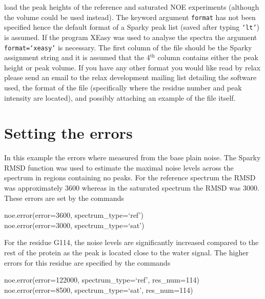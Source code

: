 load the peak heights of the reference and saturated NOE experiments (although the volume could be used instead).  The keyword argument \texttt{format} has not been specified hence the default format of a Sparky peak list (saved after typing \texttt{`lt'}) is assumed.  If the program XEasy was used to analyse the spectra the argument \texttt{format=`xeasy'} is necessary.  The first column of the file should be the Sparky assignment string and it is assumed that the 4$^\textrm{th}$ column contains either the peak height or peak volume.  If you have any other format you would like read by relax please send an email to the relax development mailing list detailing the software used, the format of the file (specifically where the residue number and peak intensity are located), and possibly attaching an example of the file itself.




\section{Setting the errors}

In this example the errors where measured from the base plain noise.  The Sparky RMSD function was used to estimate the maximal noise levels across the spectrum in regions containing no peaks.  For the reference spectrum the RMSD was approximately 3600 whereas in the saturated spectrum the RMSD was 3000.  These errors are set by the commands

\begin{exampleenv}
noe.error(error=3600, spectrum\_type=`ref') \\
noe.error(error=3000, spectrum\_type=`sat')
\end{exampleenv}

For the residue G114, the noise levels are significantly increased compared to the rest of the protein as the peak is located close to the water signal.  The higher errors for this residue are specified by the commands

\begin{exampleenv}
noe.error(error=122000, spectrum\_type=`ref', res\_num=114) \\
noe.error(error=8500, spectrum\_type=`sat', res\_num=114)
\end{exampleenv}



